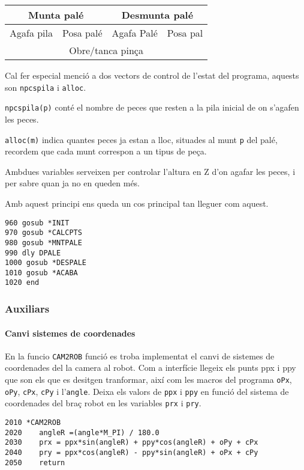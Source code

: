 \begin{center}
\begin{tabular}{|l|l|l|l|}
\hline
\multicolumn{2}{|c|}{Munta palé} & \multicolumn{2}{|c|}{Desmunta palé}\\
\hline
Agafa pila & Posa palé & Agafa Palé & Posa pal\\
\hline
\multicolumn{4}{|c|}{Obre/tanca pinça}\\
\hline
\end{tabular}
\end{center}


Cal fer especial menció a dos vectors de control de l'estat del programa,
aquests son \texttt{npcspila} i \texttt{alloc}.

\texttt{npcspila(p)} conté el nombre de peces que resten a la pila inicial de
on s'agafen les peces.

\texttt{alloc(m)} indica quantes peces ja estan a lloc, situades al munt
\texttt{p} del palé, recordem que cada munt correspon a un tipus de peça.

Ambdues variables serveixen per controlar l'altura en Z d'on agafar les
peces, i per sabre quan ja no en queden més.

Amb aquest principi ens queda un cos principal tan lleguer com aquest.
\begin{verbatim}
960 gosub *INIT
970 gosub *CALCPTS
980 gosub *MNTPALE
990 dly DPALE
1000 gosub *DESPALE
1010 gosub *ACABA
1020 end
\end{verbatim}

\subsubsection{Auxiliars}
\paragraph{Canvi sistemes de coordenades}
En la funcio \texttt{CAM2ROB} funció es troba implementat el canvi de sistemes
de coordenades del la camera al robot.
Com a interfície llegeix els punts ppx i ppy que son els que es desitgen
tranformar, així com les macros del programa \texttt{oPx}, \texttt{oPy},
\texttt{cPx}, \texttt{cPy} i l'\texttt{angle}. Deixa els valors de
\texttt{ppx} i \texttt{ppy} en funció del sistema de coordenades del braç
robot en les variables \texttt{prx} i \texttt{pry}.

\begin{verbatim}
2010 *CAM2ROB
2020 	angleR =(angle*M_PI) / 180.0
2030    prx = ppx*sin(angleR) + ppy*cos(angleR) + oPy + cPx
2040    pry = ppx*cos(angleR) - ppy*sin(angleR) + oPx + cPy
2050    return
\end{verbatim}


